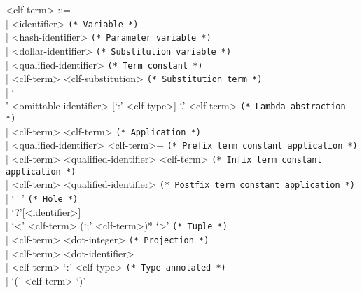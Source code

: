 \documentclass[11pt]{article}
\begin{document}
\begin{grammar}
<clf-term> ::= \hfill\\
| <identifier> \hfill \texttt{(* Variable *)}\\
| <hash-identifier> \hfill \texttt{(* Parameter variable *)}\\
| <dollar-identifier> \hfill \texttt{(* Substitution variable *)}\\
| <qualified-identifier> \hfill \texttt{(* Term constant *)}\\
| <clf-term> <clf-substitution> \hfill \texttt{(* Substitution term *)}\\
| `\\' <omittable-identifier> [`:' <clf-type>] `.' <clf-term> \hfill \texttt{(* Lambda abstraction *)}\\
| <clf-term> <clf-term> \hfill \texttt{(* Application *)}\\
| <qualified-identifier> <clf-term>+ \hfill \texttt{(* Prefix term constant application *)}\\
| <clf-term> <qualified-identifier> <clf-term> \hfill \texttt{(* Infix term constant application *)}\\
| <clf-term> <qualified-identifier> \hfill \texttt{(* Postfix term constant application *)}\\
| `_' \hfill \texttt{(* Hole *)}\\
| `?'[<identifier>]\\
| `<' <clf-term> (`;' <clf-term>)* `>' \hfill \texttt{(* Tuple *)}\\
| <clf-term> <dot-integer> \hfill \texttt{(* Projection *)}\\
| <clf-term> <dot-identifier>\\
| <clf-term> `:' <clf-type> \hfill \texttt{(* Type-annotated *)}\\
| `(' <clf-term> `)'


\end{grammar}
\end{document}
